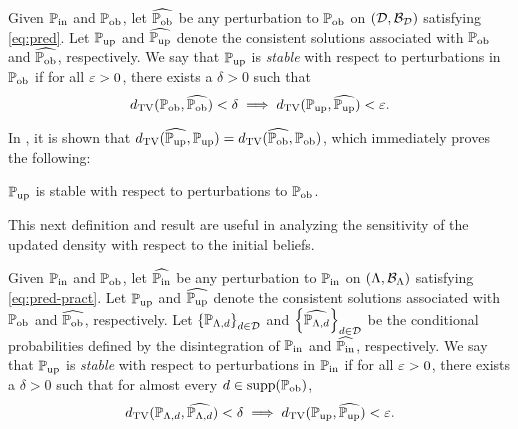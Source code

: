 \begin{defn}\label{defn:stableobs}
  Given $\operatorname*{\mathbb{P}_{in}}$ and $\operatorname*{\mathbb{P}_{ob}}$, let $\widehat{\operatorname*{\mathbb{P}_{ob}}}$ be any perturbation to $\operatorname*{\mathbb{P}_{ob}}$ on $(\mathcal{D}, \mathcal{B}_{\mathcal{D}})$ satisfying \eqref{eq:pred}.
  Let $\operatorname*{\mathbb{P}_{up}}$ and $\widehat{\operatorname*{\mathbb{P}_{up}}}$ denote the consistent solutions associated with $\operatorname*{\mathbb{P}_{ob}}$ and $\widehat{\operatorname*{\mathbb{P}_{ob}}}$, respectively.
  We say that $\operatorname*{\mathbb{P}_{up}}$ is \emph{stable} with respect to perturbations in $\operatorname*{\mathbb{P}_{ob}}$ if for all $\varepsilon > 0$, there exists a $\delta > 0$ such that
  \begin{equation}
    d_{\text{TV}} (\operatorname*{\mathbb{P}_{ob}}, \widehat{\operatorname*{\mathbb{P}_{ob}}}) < \delta \implies d_{\text{TV}} (\operatorname*{\mathbb{P}_{up}}, \widehat{\operatorname*{\mathbb{P}_{up}}}) < \varepsilon.
  \end{equation}
\end{defn}

In \cite{BJW18a}, it is shown that $d_{\text{TV}} (\widehat{\operatorname*{\mathbb{P}_{up}}}, \operatorname*{\mathbb{P}_{up}}) = d_{\text{TV}} (\widehat{\operatorname*{\mathbb{P}_{ob}}}, \operatorname*{\mathbb{P}_{ob}})$, which immediately proves the following:

\begin{thm}
  $\operatorname*{\mathbb{P}_{up}}$ is stable with respect to perturbations to $\operatorname*{\mathbb{P}_{ob}}$.
  \label{thm:stableobs}
\end{thm}

This next definition and result are useful in analyzing the sensitivity of the updated density with respect to the initial beliefs.

\begin{defn}\label{defn:stableinitial}
  Given $\operatorname*{\mathbb{P}_{in}}$ and $\operatorname*{\mathbb{P}_{ob}}$, let $\widehat{\operatorname*{\mathbb{P}_{in}}}$ be any perturbation to $\operatorname*{\mathbb{P}_{in}}$ on $({\Lambda}, \mathcal{B}_{{\Lambda}})$ satisfying \eqref{eq:pred-pract}.
  Let $\operatorname*{\mathbb{P}_{up}}$ and $\widehat{\operatorname*{\mathbb{P}_{up}}}$ denote the consistent solutions associated with $\operatorname*{\mathbb{P}_{ob}}$ and $\widehat{\operatorname*{\mathbb{P}_{ob}}}$, respectively.
  Let $\left\{\mathbb{P}_{{\Lambda}, d}\right\}_{d\in\mathcal{D}}^{}$ and $\left\{\widehat{\mathbb{P}_{{\Lambda}, d}}\right\}_{d\in\mathcal{D}}^{}$ be the conditional probabilities defined by the disintegration of $\operatorname*{\mathbb{P}_{in}}$ and $\widehat{\operatorname*{\mathbb{P}_{in}}}$, respectively.
  We say that $\operatorname*{\mathbb{P}_{up}}$ is \emph{stable} with respect to perturbations in $\operatorname*{\mathbb{P}_{in}}$ if for all $\varepsilon > 0$, there exists a $\delta > 0$ such that for almost every $d\in\text{supp}(\operatorname*{\mathbb{P}_{ob}})$,
  \begin{equation}\label{eq:stableinitial}
    d_{\text{TV}} (\mathbb{P}_{{\Lambda}, d}, \widehat{\mathbb{P}_{{\Lambda}, d}}) < \delta \implies d_{\text{TV}} (\operatorname*{\mathbb{P}_{up}}, \widehat{\operatorname*{\mathbb{P}_{up}}}) < \varepsilon.
  \end{equation}
\end{defn}


